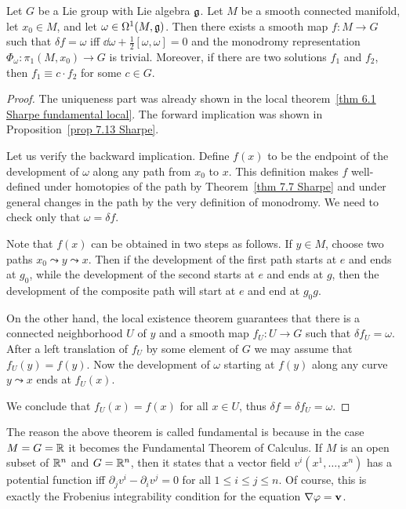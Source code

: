 \begin{thm}\label{thm 7.14 Sharpe fundamental global}
    Let $G$ be a Lie group with Lie algebra $\frakg$. Let $M$ be a smooth connected manifold, let $x_0\in M$, and let $\omega \in\Omega^1(M,\frakg)$. Then there exists a smooth map $f:M\to G$ such that $\delta f=\omega$ iff $\dd\omega+\frac12[\omega,\omega]=0$ and the monodromy representation $\Phi_\omega:\pi_1(M,x_0)\to G$ is trivial. Moreover, if there are two solutions $f_1$ and $f_2$, then $f_1\equiv c\cdot f_2$ for some $c\in G$.
\end{thm}
\begin{proof}
    The uniqueness part was already shown in the local theorem~\ref{thm 6.1 Sharpe fundamental local}. The forward implication  was shown in Proposition~\ref{prop 7.13 Sharpe}.

    Let us verify the backward implication. Define $f(x)$ to be the endpoint of the development of $\omega$ along any path from $x_0$ to $x$. This definition makes $f$ well-defined under homotopies of the path by Theorem~\ref{thm 7.7 Sharpe} and under general changes in the path by the very definition of monodromy. We need to check only that $\omega=\delta f$.

    Note that $f(x)$ can be obtained in two steps as follows. If $y\in M$, choose two paths $x_0\leadsto y\leadsto x$. Then if the development of the first path starts at $e$ and ends at $g_0$, while the development of the second starts at $e$ and ends at $g$, then the development of the composite path will start at $e$ and end at $g_0g$. 
    
    On the other hand, the local existence theorem guarantees that there is a connected neighborhood $U$ of $y$ and a smooth map $f_U:U\to G$ such that $\delta f_U=\omega$. After a left translation of $f_U$ by some element of $G$ we may assume that $f_U(y)=f(y)$. Now the development of $\omega$ starting at $f(y)$ along any curve $y\leadsto x$ ends at $f_U(x)$. 
    
    We conclude that $f_U(x)=f(x)$ for all $x\in U$, thus $\delta f=\delta f_U=\omega$.
\end{proof}

\begin{rem}
    The reason the above theorem is called fundamental is because in the case $M=G=\bbR$ it becomes the Fundamental Theorem of Calculus. If $M$ is an open subset of $\bbR^n$ and $G=\bbR^n$, then it states that a vector field $v^i(x^1,\ldots,x^n)$ has a potential function iff $\partial_j v^i-\partial_i v^j=0$ for all $1\leq i\leq j\leq n$. Of course, this is exactly the Frobenius integrability condition for the equation $\nabla \varphi=\bf{v}$.
\end{rem}

